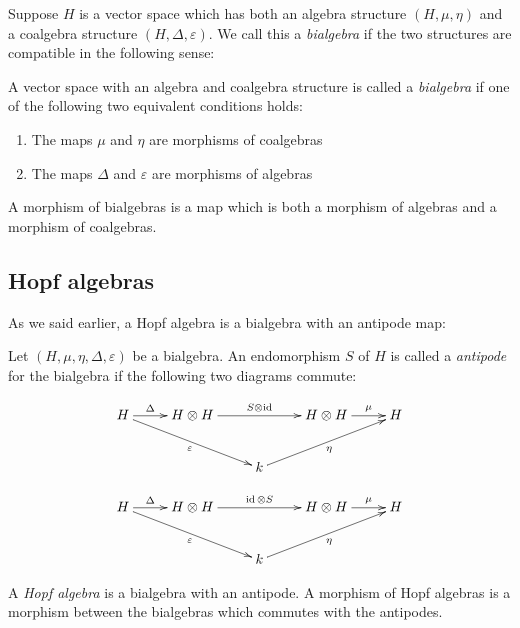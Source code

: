 Suppose $H$ is a vector space which has both an algebra structure $(H, \mu,
\eta)$ and a coalgebra structure $(H, \Delta, \varepsilon)$. We call this a
\emph{bialgebra} if the two structures are compatible in the following sense:

\begin{defn}
    A vector space with an algebra and coalgebra structure is called a
    \emph{bialgebra} if one of the following two equivalent conditions holds:

    \begin{enumerate}
        \item The maps $\mu$ and $\eta$ are morphisms of coalgebras
        \item The maps $\Delta$ and $\varepsilon$ are morphisms of algebras
    \end{enumerate}
\end{defn}

A morphism of bialgebras is a map which is both a morphism of algebras and a
morphism of coalgebras.
\subsection{Hopf algebras}
As we said earlier, a Hopf algebra is a bialgebra with an antipode map:

\begin{defn}
    Let $(H, \mu, \eta, \Delta, \varepsilon)$ be a bialgebra. An endomorphism
    $S$ of $H$ is called a \emph{antipode} for the bialgebra if the following
    two diagrams commute:

    \begin{equation}
        \xymatrix{
        H \ar[r]^-{\Delta} \ar[rrd]_-{\varepsilon}& H \otimes H \ar[rr]^-{S \otimes \id} & & H \otimes H \ar[r]^-{\mu} & H \\
        & & k \ar[rru]_-{\eta}& &
        }
    \end{equation}

    \begin{equation}
        \xymatrix{
        H \ar[r]^-{\Delta} \ar[rrd]_-{\varepsilon}& H \otimes H \ar[rr]^-{\id \otimes S} & & H \otimes H \ar[r]^-{\mu} & H \\
        & & k \ar[rru]_-{\eta}& &
        }
    \end{equation}
\end{defn}

\begin{defn}
    A \emph{Hopf algebra} is a bialgebra with an antipode. A morphism of Hopf
    algebras is a morphism between the bialgebras which commutes with the
    antipodes. 
\end{defn}

